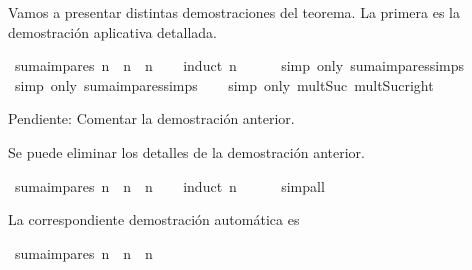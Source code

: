 \begin{isabellebody}
\begin{isamarkuptext}
  Vamos a presentar distintas demostraciones del teorema. La 
  primera es la demostración aplicativa detallada.%
\end{isamarkuptext}\isamarkuptrue%
\isamarkupfalse%
\ {\isachardoublequoteopen}suma{\isacharunderscore}impares\ n\ {\isacharequal}\ n\ {\isacharasterisk}\ n{\isachardoublequoteclose}\isanewline
%
\isadelimproof
\ \ %
\endisadelimproof
%
\isatagproof
{}\isamarkupfalse%
\ {\isacharparenleft}induct\ n{\isacharparenright}\ \isanewline
\ \ \ \isamarkupfalse%
\ {\isacharparenleft}simp\ only{\isacharcolon}\ suma{\isacharunderscore}impares{\isachardot}simps{\isacharparenleft}{}{\isacharparenright}{\isacharparenright}\isanewline
\ \ \isamarkupfalse%
\ {\isacharparenleft}simp\ only{\isacharcolon}\ suma{\isacharunderscore}impares{\isachardot}simps{\isacharparenleft}{}{\isacharparenright}{\isacharparenright}\isanewline
\ \ \isamarkupfalse%
\ {\isacharparenleft}simp\ only{\isacharcolon}\ mult{\isacharunderscore}Suc\ mult{\isacharunderscore}Suc{\isacharunderscore}right{\isacharparenright}\isanewline
\ \ \isamarkupfalse%
%
\endisatagproof
{\isafoldproof}%
%
\isadelimproof
%
\endisadelimproof
%
\begin{isamarkuptext}%
Pendiente: Comentar la demostración anterior.%
\end{isamarkuptext}\isamarkuptrue%
%
\begin{isamarkuptext}%
Se puede eliminar los detalles de la demostración anterior.%
\end{isamarkuptext}\isamarkuptrue%
\isamarkupfalse%
\ {\isachardoublequoteopen}suma{\isacharunderscore}impares\ n\ {\isacharequal}\ n\ {\isacharasterisk}\ n{\isachardoublequoteclose}\isanewline
%
\isadelimproof
\ \ %
\endisadelimproof
%
\isatagproof
{}\isamarkupfalse%
\ {\isacharparenleft}induct\ n{\isacharparenright}\ \isanewline
\ \ \ \isamarkupfalse%
\ simp{\isacharunderscore}all\isanewline
\ \ \isamarkupfalse%
%
\endisatagproof
{\isafoldproof}%
%
\isadelimproof
%
\endisadelimproof
%
\begin{isamarkuptext}%
La correspondiente demostración automática es%
\end{isamarkuptext}\isamarkuptrue%
\isamarkupfalse%
\ {\isachardoublequoteopen}suma{\isacharunderscore}impares\ n\ {\isacharequal}\ n\ {\isacharasterisk}\ n{\isachardoublequoteclose}\isanewline
%
\isadelimproof
\ \ %
\endisadelimproof
%
\isatagproof

\end{isabellebody}
